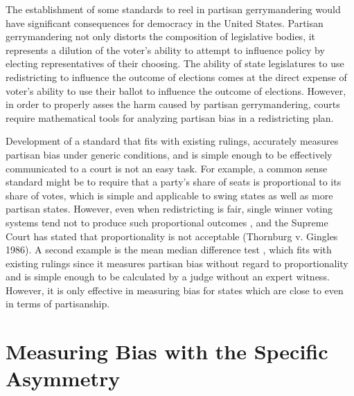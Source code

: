 \documentclass[preprint,12pt]{article}
\begin{document}
The establishment of some standards to reel in partisan gerrymandering would have significant consequences for democracy in the United States.
Partisan gerrymandering not only distorts the composition of legislative bodies, it represents a dilution of the voter's ability to attempt to influence policy by electing representatives of their choosing.
The ability of state legislatures to use redistricting to influence the outcome of elections comes at the direct expense of voter's ability to use their ballot to influence the outcome of elections.
However, in order to properly asses the harm caused by partisan gerrymandering, courts require mathematical tools for analyzing partisan bias in a redistricting plan.

Development of a standard that fits with existing rulings, accurately measures partisan bias under generic conditions, and is simple enough to be effectively communicated to a court is not an easy task.
For example, a common sense standard might be to require that a party's share of seats is proportional to its share of votes, which is simple and applicable to swing states as well as more partisan states.
However, even when redistricting is fair, single winner voting systems tend not to produce such proportional outcomes \cite{Kendall_1950_10.2307/588113}, and the Supreme Court has stated that proportionality is not acceptable (Thornburg v. Gingles 1986).
A second example is the mean median difference test \cite{Wang__,Wang_2016_10.1089/elj.2016.0387,McDonald_2015_10.1089/elj.2015.0358}, which fits with existing rulings since it measures partisan bias without regard to proportionality and is simple enough to be calculated by a judge without an expert witness.
However, it is only effective in measuring bias for states which are close to even in terms of partisanship. \cite{Wang_2016_10.1089/elj.2016.0387}


\section{Measuring Bias with the Specific Asymmetry\label{sec:MB}}
\end{document}
